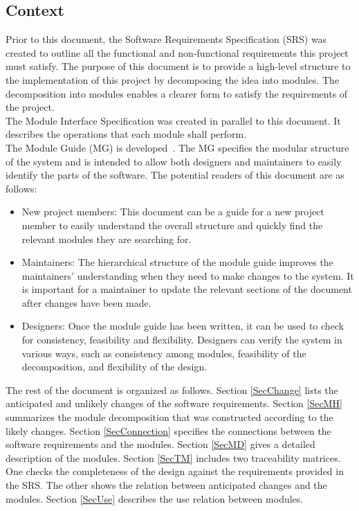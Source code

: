 \documentclass[12pt, titlepage]{article}
\begin{document}

\subsection{Context}
Prior to this document, the Software Requirements Specification (SRS) was created to outline all the functional and non-functional requirements this project must satisfy. The purpose of this document is to provide a high-level structure to the implementation of this project by decomposing the idea into modules. The decomposition into modules enables a clearer form to satisfy the requirements of the project.\\

\noindent The Module Interface Specification was created in parallel to this document. It describes the operations that each module shall perform.\\

\noindent The Module Guide (MG) is developed~\citep{ParnasEtAl1984}. The MG specifies the modular structure of the system and is intended to allow both designers and maintainers to easily identify the parts of the software. The potential readers of this document are as follows:

\begin{itemize}
\item New project members: This document can be a guide for a new project member
  to easily understand the overall structure and quickly find the
  relevant modules they are searching for.
\item Maintainers: The hierarchical structure of the module guide improves the
  maintainers' understanding when they need to make changes to the system. It is
  important for a maintainer to update the relevant sections of the document
  after changes have been made.
\item Designers: Once the module guide has been written, it can be used to
  check for consistency, feasibility and flexibility. Designers can verify the
  system in various ways, such as consistency among modules, feasibility of the
  decomposition, and flexibility of the design.
\end{itemize}

\noindent The rest of the document is organized as follows. Section \ref{SecChange} lists the anticipated and unlikely changes of the software requirements. Section \ref{SecMH} summarizes the module decomposition that was constructed according to the likely changes. Section \ref{SecConnection} specifies the connections between the software requirements and the modules. Section \ref{SecMD} gives a detailed description of the modules. Section \ref{SecTM} includes two traceability matrices. One checks the completeness of the design against the requirements provided in the SRS. The other shows the relation between anticipated changes and the modules. Section \ref{SecUse} describes the use relation between modules.
\end{document}
